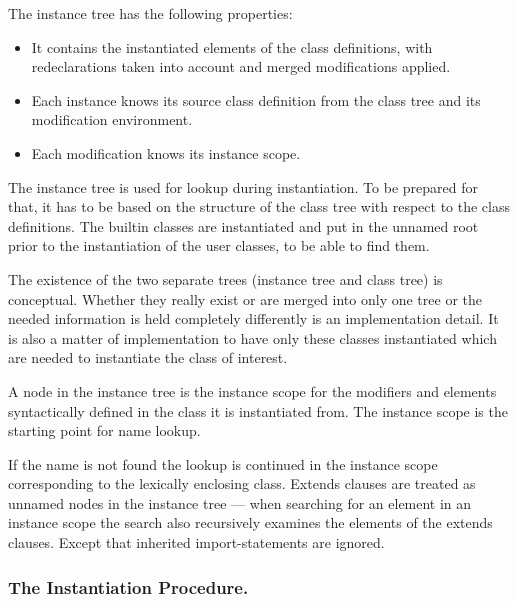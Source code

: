 The instance tree has the following properties:
\begin{itemize}
\item
  It contains the instantiated elements of the class definitions, with
  redeclarations taken into account and merged modifications applied.
\end{itemize}

\begin{itemize}
\item
  Each instance knows its source class definition from the class tree
  and its modification environment.
\item
  Each modification knows its instance scope.
\end{itemize}

The instance tree is used for lookup during instantiation. To be
prepared for that, it has to be based on the structure of the class tree
with respect to the class definitions. The builtin classes are
instantiated and put in the unnamed root prior to the instantiation of
the user classes, to be able to find them.

\begin{nonnormative}
The existence of the two separate trees (instance tree and
class tree) is conceptual. Whether they really exist or are merged into
only one tree or the needed information is held completely differently
is an implementation detail. It is also a matter of implementation to
have only these classes instantiated which are needed to instantiate the
class of interest.
\end{nonnormative}

A node in the instance tree is the instance scope for the modifiers and
elements syntactically defined in the class it is instantiated from. The
instance scope is the starting point for name lookup.

\begin{nonnormative}
If the name is not found the lookup is continued in the instance scope corresponding to the lexically enclosing class.  Extends clauses are treated as unnamed nodes in the
instance tree --- when searching for an element in an instance scope the search also recursively examines the elements of the extends clauses.  Except that inherited
import-statements are ignored.
\end{nonnormative}

\subsubsection{The Instantiation Procedure.}\label{the-instantiation-procedure}

